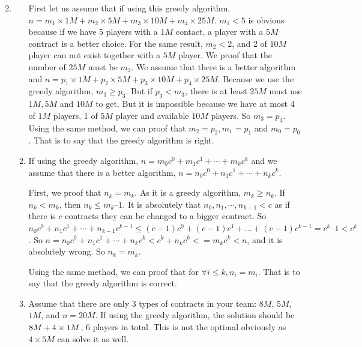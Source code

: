 \documentclass[12pt,a4paper]{article}
\makeatletter
\newtheorem*{solution}{Solution}
\theoremstyle{definition}
\renewenvironment{solution}[1][Solution] {\par\pushQED{\qed}\normalfont\topsep6\p@\@plus6\p@\relax\trivlist\item[\hskip\labelsep\bfseries#1\@addpunct{.}]\ignorespaces}{\popQED\endtrivlist\@endpefalse} \makeatother
\makeatother
\begin{document}
\begin{enumerate}
\begin{solution}
\begin{enumerate}
        First let us assume that if using this greedy algorithm, $n = m_1\times 1M+m_2\times 5M+m_3\times 10M+ m_4 \times 25M$. $m_1 < 5$ is obvious because if we have 5 players with a $1M$ contact, a player with a $5M$ contract is a better choice. For the same result, $m_2 < 2$, and 2 of $10M$ player can not exist together with a $5M$ player. We proof that the number of $25M$ must be $m_3$. We assume that there is a better algorithm and $n = p_1\times 1M+p_2\times 5M+p_3\times 10M+ p_4 \times 25M$. Because we use the greedy algorithm, $m_3 \geqslant p_3$. But if $p_3<m_3$, there is at least $25M$ must use $1M,5M$ and $10M$ to get. But it is impossible because we have at most 4 of $1M$ players, 1 of $5M$ player and available $10M$ players. So $m_3 = p_3$. Using the same method, we can proof that $m_2 = p_2, m_1 = p_1$ and $m_0 = p_0$. That is to say that the greedy algorithm is right. 
        
        \item If using the greedy algorithm, $n = m_0c^0 + m_1c^1 + \cdots + m_kc^k$ and we assume that there is a better algorithm, $n = n_0c^0 + n_1c^1 + \cdots + n_kc^k$. 

First, we proof that $n_k = m_k$. As it is a greedy algorithm, $m_k \geqslant n_k$. If $n_k < m_k$, then $n_k \leqslant m_k – 1$.
It is absolutely that $n_0, n_1, \cdots, n_{k-1} < c$ as if there is $c$ contracts they can be changed to a bigger contract. So $n_0c^0 + n_1c^1 + \cdots + n_{k-1}c^{k-1} \leqslant (c - 1)c^0 + (c - 1)c^1 + … + (c - 1)c^{k-1} = c^k – 1 < c^k$. So $n = n_0c^0 + n_1c^1 + \cdots + n_kc^k < c^k + n_kc^k <= m_kc^k < n$, and it is absolutely wrong. So $n_k = m_k$.

Using the same method, we can proof that for $\forall i \leqslant k, n_i = m_i$. That is to say that the greedy algorithm is correct.

\item Assume that there are only 3 types of contracts in your team: $ 8M $, $ 5M $, $ 1M $, and $n = 20M$. If using the greedy algorithm, the solution should be $8 \time 8M + 4\times 1M$, 6 players in total. This is not the optimal obviously as $4\times 5M$ can solve it as well. 

        \end{enumerate}
    \end{solution}
	

\end{enumerate}
\end{document}
